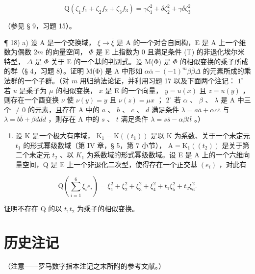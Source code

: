 \[
\mathrm{Q} \left(\zeta_ {1} f _ {1} + \zeta_ {2} f _ {2} + \zeta_ {3} f _ {3}\right) = \gamma \zeta_ {1} ^ {2} + \delta \zeta_ {2} ^ {2} + \gamma \delta \zeta_ {3} ^ {2}
\]

（参见 § 9，习题 15）。

¶ 18) a) 设 A 是一个交换域， \(\xi \to \bar{\xi}\) 是 A 的一个对合自同构，E 是 A 上一个维数为偶数 \(2m\) 的向量空间， \(\Phi\) 是 E 上指数为 0 且满足条件 (T) 的非退化埃尔米特型， \(\Delta\) 是 \(\Phi\) 关于 E 的一个基的判别式。设 M(Φ) 是 \(\Phi\) 的相似变换的乘子所成的群（§ 4，习题 8）。证明 M(Φ) 是 A 中形如 \(\alpha\bar{\alpha} - (-1)^{m}\beta\bar{\beta}\Delta\) 的元素所成的乘法群的一个子群。（对 \(m\) 用归纳法论证，并利用习题 17 以及下面两个注记： \(1^{\circ}\) 若 \(u\) 是乘子为 \(\mu\) 的相似变换， \(x\) 是 E 的一个向量， \(y = u(x)\) 且 \(z = u(y)\) ，则存在一个酉变换 \(\nu\) 使 \(\nu(y) = y\) 且 \(\nu(z) = \mu x\) ； \(2^{\circ}\) 若 \(\alpha\) 、 \(\beta\) 、 \(\lambda\) 是 A 中三个 \(\neq 0\) 的元素，且存在 A 中的 \(a\) 、 \(b\) 、 \(c\) 、 \(d\) 满足条件 \(\lambda = a\bar{a} + \alpha c\bar{c}\) 与 \(\lambda = b\bar{b} + \beta dd\bar{d}\) ，则存在 A 中的 \(s\) 、 \(t\) 满足条件 \(\lambda = s\bar{s} - \alpha\beta t\bar{t}\) 。）

\begin{enumerate}
\def\labelenumi{\alph{enumi})}
\setcounter{enumi}{1}
\tightlist
\item
  设 K 是一个极大有序域， \(\mathrm{K}_{1} = \mathrm{K}((t_{1}))\) 是以 K 为系数、关于一个未定元 \(t_{1}\) 的形式幂级数域（第 IV 章，§ 5，第 7 小节）， \(\mathrm{A} = \mathrm{K}_{1}((t_{2}))\) 是关于第二个未定元 \(t_{2}\) 、以 \(K_{1}\) 为系数域的形式幂级数域。设 E 是 A 上的一个六维向量空间，Q 是 E 上一个非退化二次型，使得存在一个正交基 \((e_{i})\) ，对此有
\end{enumerate}

\[
\mathrm{Q} (\sum_ {i = 1} ^ {6} \xi_ {i} e _ {i}) = \xi_ {1} ^ {2} + \xi_ {2} ^ {2} + \xi_ {3} ^ {2} + \xi_ {4} ^ {2} + t _ {1} \xi_ {5} ^ {2} + t _ {2} \xi_ {6} ^ {2}.
\]

证明不存在 Q 的以 \(t_{1}t_{2}\) 为乘子的相似变换。

\backmatter
\chapter*{历史注记}
{}

（注意——罗马数字指本注记之末所附的参考文献。）

